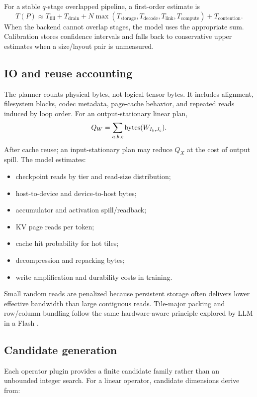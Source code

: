 For a stable $q$-stage overlapped pipeline, a first-order estimate is
\begin{equation}
\label{eq:pipeline-cost}
T(P)\approx T_{\mathrm{fill}}+T_{\mathrm{drain}}
 +N\max(T_{\mathrm{storage}},T_{\mathrm{decode}},T_{\mathrm{link}},T_{\mathrm{compute}})
 +T_{\mathrm{contention}}.
\end{equation}
When the backend cannot overlap stages, the model uses the appropriate sum. Calibration stores confidence intervals and falls back to conservative upper estimates when a size/layout pair is unmeasured.

\subsection{IO and reuse accounting}

The planner counts physical bytes, not logical tensor bytes. It includes alignment, filesystem blocks, codec metadata, page-cache behavior, and repeated reads induced by loop order. For an output-stationary linear plan,
\[
  Q_W=\sum_{a,b,c}\operatorname{bytes}(W_{I_b,J_c}).
\]
After cache reuse; an input-stationary plan may reduce $Q_X$ at the cost of output spill. The model estimates:

\begin{itemize}
  \item checkpoint reads by tier and read-size distribution;
  \item host-to-device and device-to-host bytes;
  \item accumulator and activation spill/readback;
  \item KV page reads per token;
  \item cache hit probability for hot tiles;
  \item decompression and repacking bytes;
  \item write amplification and durability costs in training.
\end{itemize}

Small random reads are penalized because persistent storage often delivers lower effective bandwidth than large contiguous reads. Tile-major packing and row/column bundling follow the same hardware-aware principle explored by LLM in a Flash \cite{alizadeh2023llmflash}.

\subsection{Candidate generation}

Each operator plugin provides a finite candidate family rather than an unbounded integer search. For a linear operator, candidate dimensions derive from:

